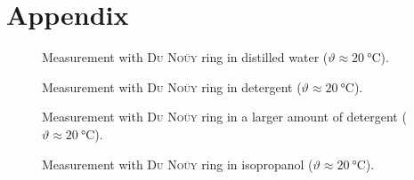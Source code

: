 \chapter{Appendix}
    \begin{figure}[h]
        \centering
        
        \caption[Measurement with \textsc{Du Noüy} ring in distilled water (\(\vartheta \approx \SI{20}{\celsius}\))]{Measurement with \textsc{Du Noüy} ring in distilled water (\(\vartheta \approx \SI{20}{\celsius}\)).}
        \label{fig:Du_Nouy_Method_Measurement_with_distilled_water_No_1}
    \end{figure}
    \begin{figure}[h]
        \centering
        
        \caption[Measurement with \textsc{Du Noüy} ring in detergent (\(\vartheta \approx \SI{20}{\celsius}\))]{Measurement with \textsc{Du Noüy} ring in detergent (\(\vartheta \approx \SI{20}{\celsius}\)).}
        \label{fig:Du_Nouy_Method_Measurement_with_detergent_No_1}
    \end{figure}
    \begin{figure}[h]
        \centering
        
        \caption[Measurement with \textsc{Du Noüy} ring in a larger amount of detergent (\(\vartheta \approx \SI{20}{\celsius}\))]{Measurement with \textsc{Du Noüy} ring in a larger amount of detergent (\(\vartheta \approx \SI{20}{\celsius}\)).}
        \label{fig:Du_Nouy_Method_Measurement_with_more_detergent_No_1}
    \end{figure}
    \begin{figure}[h]
        \centering
        
        \caption[Measurement with \textsc{Du Noüy} ring in isopropanol (\(\vartheta \approx \SI{20}{\celsius}\))]{Measurement with \textsc{Du Noüy} ring in isopropanol (\(\vartheta \approx \SI{20}{\celsius}\)).}
        \label{fig:Du_Nouy_Method_Measurement_with_isopropanol_No_1}
    \end{figure}
    \newpage
